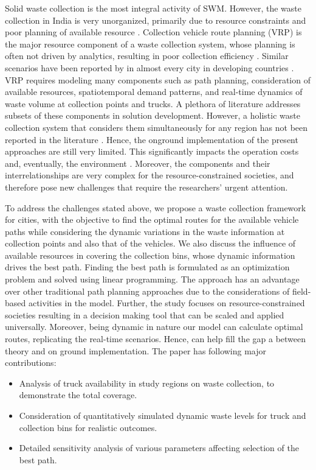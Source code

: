 \documentclass[12pt]{article}
\begin{document}
Solid waste collection is the most integral activity of SWM. However, the waste collection in India is very unorganized, primarily due to resource constraints and poor planning of available resource \cite{somani2021integrated,GUPTA2015206}. Collection vehicle route planning (VRP) is the major resource component of a waste collection system, whose planning is often not driven by analytics, resulting in poor collection efficiency \cite{akbarpour2021innovative}. Similar scenarios have been reported by in almost every city in developing countries \cite{GUPTA2015206}. VRP requires modeling many components such as path planning, consideration of available resources, spatiotemporal demand patterns, and real-time dynamics of waste volume at collection points and trucks. A plethora of literature addresses subsets of these components in solution development. However, a holistic waste collection system that considers them simultaneously for any region has not been reported in the literature \cite{han2015waste}. Hence, the onground implementation of the present approaches are still very limited. This significantly impacts the operation costs and, eventually, the environment \cite{apaydin2007route}. Moreover, the components and their interrelationships are very complex for the resource-constrained societies, and therefore pose new challenges that require the researchers' urgent attention.

To address the challenges stated above, we propose a waste collection framework for cities, with the objective to find the optimal routes for the available vehicle paths while considering the dynamic variations in the waste information at collection points and also that of the vehicles. We also discuss the influence of available resources in covering the collection bins, whose dynamic information drives the best path. Finding the best path is formulated as an optimization problem and solved using linear programming. The approach has an advantage over other traditional path planning approaches due to the considerations of field-based activities in the model. Further, the study  focuses on resource-constrained societies resulting in a decision making tool that can be scaled and applied universally. Moreover, being dynamic in nature our model can calculate optimal routes, replicating the real-time scenarios. Hence, can help fill the gap a between theory and on ground implementation. The paper has following major contributions:

\begin{itemize}
\item Analysis of truck availability in study regions on waste collection, to demonstrate the total coverage.
\item Consideration of quantitatively simulated dynamic waste levels for truck and
collection bins for realistic outcomes.
\item Detailed sensitivity analysis of various parameters affecting selection of the best path.
\end{itemize}
\end{document}
